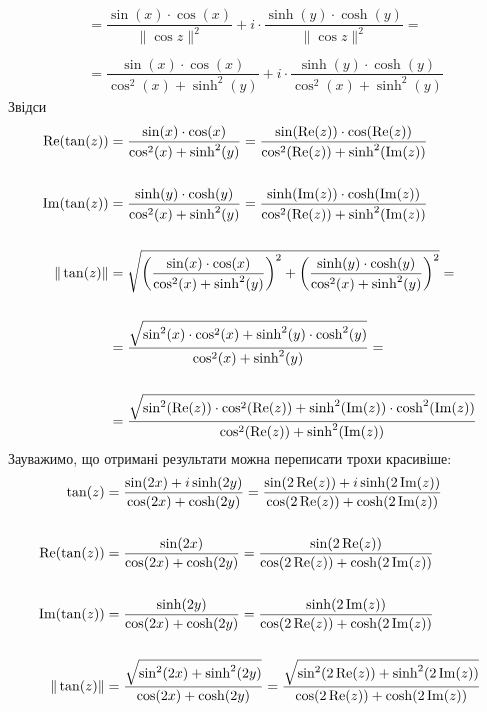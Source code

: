 \begin{solution}
\begin{enumerate}
\begin{align*}
            \\
            &= \dfrac{\sin (x) \cdot \cos (x)}{\|\cos z\|^2} + i \cdot \dfrac{\sinh (y) \cdot \cosh (y)}{\|\cos z\|^2} = \\
            \\
            &= \dfrac{\sin (x) \cdot \cos (x)}{\cos^2(x) + \sinh^2(y)} + i \cdot \dfrac{\sinh (y) \cdot \cosh (y)}{\cos^2(x) + \sinh^2(y)} 
        \end{align*}
        Звідси
        \begin{align*}
                \operatorname{Re}(\tan(z)) &= \dfrac{\sin (x) \cdot \cos (x)}{\cos^2(x) + \sinh^2(y)} = \dfrac{\sin (\operatorname{Re}(z)) \cdot \cos (\operatorname{Re}(z))}{\cos^2(\operatorname{Re}(z)) + \sinh^2(\operatorname{Im}(z))} \\
                \\
                \operatorname{Im}(\tan(z)) &= \dfrac{\sinh (y) \cdot \cosh (y)}{\cos^2(x) + \sinh^2(y)} = \dfrac{\sinh (\operatorname{Im}(z)) \cdot \cosh (\operatorname{Im}(z))}{\cos^2(\operatorname{Re}(z)) + \sinh^2(\operatorname{Im}(z))}  \\
                \\
                \|\tan(z)\| &= \sqrt{\left(\dfrac{\sin (x) \cdot \cos (x)}{\cos^2(x) + \sinh^2(y)} \right)^2 + \left(\dfrac{\sinh (y) \cdot \cosh (y)}{\cos^2(x) + \sinh^2(y)}\right)^2} = \\
                \\
                &= \dfrac{\sqrt{\sin^2(x) \cdot \cos^2(x) + \sinh^2 (y) \cdot \cosh^2 (y)}}{\cos^2(x) + \sinh^2(y)} = \\
                \\
                &= \dfrac{\sqrt{\sin^2(\operatorname{Re}(z)) \cdot \cos^2(\operatorname{Re}(z)) + \sinh^2 (\operatorname{Im}(z)) \cdot \cosh^2 (\operatorname{Im}(z))}}{\cos^2(\operatorname{Re}(z)) + \sinh^2(\operatorname{Im}(z))}
            \end{align*}
        Зауважимо, що отримані результати можна переписати трохи красивіше:
        \begin{align*}
                \tan(z) &= \dfrac{\sin(2x) + i \sinh(2y)}{\cos(2x) + \cosh(2y)} = \dfrac{\sin(2\operatorname{Re}(z)) + i \sinh(2\operatorname{Im}(z))}{\cos(2\operatorname{Re}(z)) + \cosh(2\operatorname{Im}(z))} \\
                \\
                \operatorname{Re}(\tan(z)) &= \dfrac{\sin(2x)}{\cos(2x) + \cosh(2y)} = \dfrac{\sin(2\operatorname{Re}(z))}{\cos(2\operatorname{Re}(z)) + \cosh(2\operatorname{Im}(z))} \\
                \\
                \operatorname{Im}(\tan(z)) &= \dfrac{\sinh(2y)}{\cos(2x) + \cosh(2y)} = \dfrac{\sinh(2\operatorname{Im}(z))}{\cos(2\operatorname{Re}(z)) + \cosh(2\operatorname{Im}(z))} \\
                \\
                \|\tan(z)\| &= \dfrac{\sqrt{\sin^2(2x) + \sinh^2(2y)}}{\cos(2x) + \cosh(2y)} = \dfrac{\sqrt{\sin^2(2\operatorname{Re}(z)) + \sinh^2(2\operatorname{Im}(z))}}{\cos(2\operatorname{Re}(z)) + \cosh(2\operatorname{Im}(z))}
        \end{align*}
    \end{enumerate}

\end{solution}


